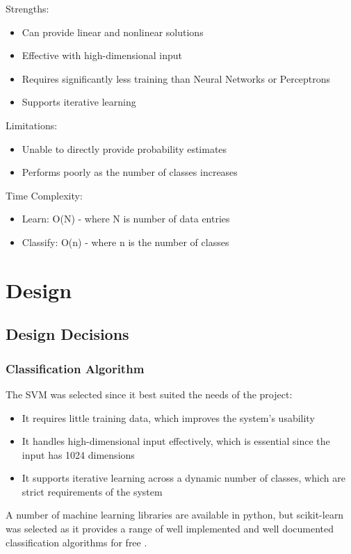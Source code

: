 Strengths:
\begin{itemize}
    \item Can provide linear and nonlinear solutions
    \item Effective with high-dimensional input
    \item Requires significantly less training than Neural Networks or Perceptrons
    \item Supports iterative learning
\end{itemize}

Limitations:
\begin{itemize}
    \item Unable to directly provide probability estimates
    \item Performs poorly as the number of classes increases
\end{itemize}

Time Complexity:
\begin{itemize}
    \item Learn: O(N) - where N is number of data entries
    \item Classify: O(n) - where n is the number of classes
\end{itemize}

\section{Design}
\subsection{Design Decisions}
\subsubsection{Classification Algorithm}
The SVM was selected since it best suited the needs of the project:
\begin{itemize}
    \item It requires little training data, which improves the system’s usability
    \item It handles high-dimensional input effectively, which is essential since the input has 1024 dimensions
    \item It supports iterative learning across a dynamic number of classes, which are strict requirements of the system
\end{itemize}

A number of machine learning libraries are available in python, but scikit-learn was selected as it provides a range of well implemented and well documented classification algorithms for free \citep{scikit-learn}.

